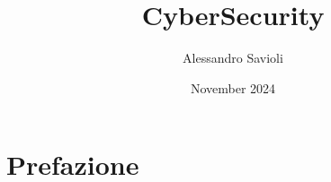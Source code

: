 \documentclass{article}
\begin{document}
\title{CyberSecurity}
\author{Alessandro Savioli}
\date{November 2024}

\maketitle

\tableofcontents

\newpage

\section{Prefazione}
\end{document}
